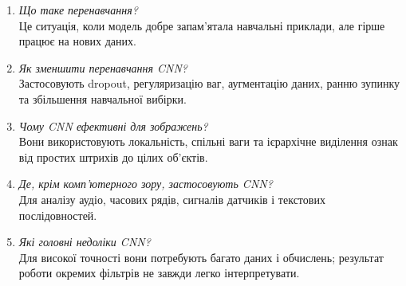 \documentclass[12pt,a4paper]{article}
\begin{document}
\begin{enumerate}[leftmargin=*]
Згорткові, активаційні, pooling, нормалізаційні, повнозв'язні та вихідні шари.
\item \textit{Що таке перенавчання?}\\
Це ситуація, коли модель добре запам'ятала навчальні приклади, але гірше працює на нових даних.
\item \textit{Як зменшити перенавчання CNN?}\\
Застосовують dropout, регуляризацію ваг, аугментацію даних, ранню зупинку та збільшення навчальної вибірки.
\item \textit{Чому CNN ефективні для зображень?}\\
Вони використовують локальність, спільні ваги та ієрархічне виділення ознак від простих штрихів до цілих об'єктів.
\item \textit{Де, крім комп'ютерного зору, застосовують CNN?}\\
Для аналізу аудіо, часових рядів, сигналів датчиків і текстових послідовностей.
\item \textit{Які головні недоліки CNN?}\\
Для високої точності вони потребують багато даних і обчислень; результат роботи окремих фільтрів не завжди легко інтерпретувати.
\end{enumerate}
\end{document}
